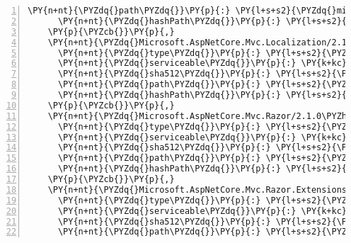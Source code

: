 \begin{Verbatim}[commandchars=\\\{\},numbers=left,firstnumber=1,stepnumber=1,numberblanklines=0]
      \PY{n+nt}{\PYZdq{}path\PYZdq{}}\PY{p}{:} \PY{l+s+s2}{\PYZdq{}microsoft.aspnetcore.mvc.formatters.xml/2.1.0\PYZhy{}rc1\PYZhy{}final\PYZdq{}}\PY{p}{,}
      \PY{n+nt}{\PYZdq{}hashPath\PYZdq{}}\PY{p}{:} \PY{l+s+s2}{\PYZdq{}microsoft.aspnetcore.mvc.formatters.xml.2.1.0\PYZhy{}rc1\PYZhy{}final.nupkg.sha512\PYZdq{}}
    \PY{p}{\PYZcb{}}\PY{p}{,}
    \PY{n+nt}{\PYZdq{}Microsoft.AspNetCore.Mvc.Localization/2.1.0\PYZhy{}rc1\PYZhy{}final\PYZdq{}}\PY{p}{:} \PY{p}{\PYZob{}}
      \PY{n+nt}{\PYZdq{}type\PYZdq{}}\PY{p}{:} \PY{l+s+s2}{\PYZdq{}package\PYZdq{}}\PY{p}{,}
      \PY{n+nt}{\PYZdq{}serviceable\PYZdq{}}\PY{p}{:} \PY{k+kc}{true}\PY{p}{,}
      \PY{n+nt}{\PYZdq{}sha512\PYZdq{}}\PY{p}{:} \PY{l+s+s2}{\PYZdq{}sha512\PYZhy{}cW57zszziAeLRjx2Q/Jzd7BJe1pz3OPXsCT4GlJBKbIC7dgs3nvXPVahpfs6t8b7IduaTSReN+3ZSD8Nz25oRA==\PYZdq{}}\PY{p}{,}
      \PY{n+nt}{\PYZdq{}path\PYZdq{}}\PY{p}{:} \PY{l+s+s2}{\PYZdq{}microsoft.aspnetcore.mvc.localization/2.1.0\PYZhy{}rc1\PYZhy{}final\PYZdq{}}\PY{p}{,}
      \PY{n+nt}{\PYZdq{}hashPath\PYZdq{}}\PY{p}{:} \PY{l+s+s2}{\PYZdq{}microsoft.aspnetcore.mvc.localization.2.1.0\PYZhy{}rc1\PYZhy{}final.nupkg.sha512\PYZdq{}}
    \PY{p}{\PYZcb{}}\PY{p}{,}
    \PY{n+nt}{\PYZdq{}Microsoft.AspNetCore.Mvc.Razor/2.1.0\PYZhy{}rc1\PYZhy{}final\PYZdq{}}\PY{p}{:} \PY{p}{\PYZob{}}
      \PY{n+nt}{\PYZdq{}type\PYZdq{}}\PY{p}{:} \PY{l+s+s2}{\PYZdq{}package\PYZdq{}}\PY{p}{,}
      \PY{n+nt}{\PYZdq{}serviceable\PYZdq{}}\PY{p}{:} \PY{k+kc}{true}\PY{p}{,}
      \PY{n+nt}{\PYZdq{}sha512\PYZdq{}}\PY{p}{:} \PY{l+s+s2}{\PYZdq{}sha512\PYZhy{}hh/9r1erSInW9SKCrW41XCUaSV+a7XTZTkXu6WFDBFAYDosvpENyzlgJRivfP8IDQma1IDE0vtsmwgb99FCMDA==\PYZdq{}}\PY{p}{,}
      \PY{n+nt}{\PYZdq{}path\PYZdq{}}\PY{p}{:} \PY{l+s+s2}{\PYZdq{}microsoft.aspnetcore.mvc.razor/2.1.0\PYZhy{}rc1\PYZhy{}final\PYZdq{}}\PY{p}{,}
      \PY{n+nt}{\PYZdq{}hashPath\PYZdq{}}\PY{p}{:} \PY{l+s+s2}{\PYZdq{}microsoft.aspnetcore.mvc.razor.2.1.0\PYZhy{}rc1\PYZhy{}final.nupkg.sha512\PYZdq{}}
    \PY{p}{\PYZcb{}}\PY{p}{,}
    \PY{n+nt}{\PYZdq{}Microsoft.AspNetCore.Mvc.Razor.Extensions/2.1.0\PYZhy{}rc1\PYZhy{}final\PYZdq{}}\PY{p}{:} \PY{p}{\PYZob{}}
      \PY{n+nt}{\PYZdq{}type\PYZdq{}}\PY{p}{:} \PY{l+s+s2}{\PYZdq{}package\PYZdq{}}\PY{p}{,}
      \PY{n+nt}{\PYZdq{}serviceable\PYZdq{}}\PY{p}{:} \PY{k+kc}{true}\PY{p}{,}
      \PY{n+nt}{\PYZdq{}sha512\PYZdq{}}\PY{p}{:} \PY{l+s+s2}{\PYZdq{}sha512\PYZhy{}T+/pvhrnWha93e969ZfDd9cJYknnggmf+zwnsSnFhluuLxARgmo+yrh7efMYe+nxYtTUOeeracXUI76u5QS5uQ==\PYZdq{}}\PY{p}{,}
      \PY{n+nt}{\PYZdq{}path\PYZdq{}}\PY{p}{:} \PY{l+s+s2}{\PYZdq{}microsoft.aspnetcore.mvc.razor.extensions/2.1.0\PYZhy{}rc1\PYZhy{}final\PYZdq{}}\PY{p}{,}

\end{Verbatim}
